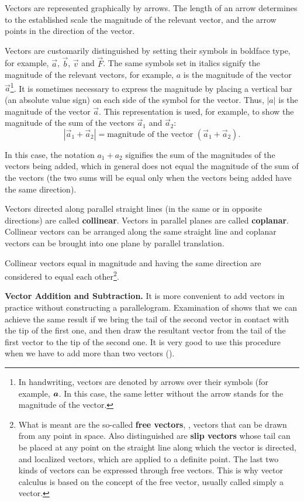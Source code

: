 Vectors are represented graphically by arrows. The length of an arrow determines to the established scale the magnitude of the relevant vector, and the arrow points in the direction of the vector.

Vectors are customarily distinguished by setting their symbols in boldface type, for example, $\vec{a}$, $\vec{b}$, $\vec{v}$ and $\vec{F}$. The same symbols set in italics signify the magnitude of the relevant vectors, for example, $a$ is the magnitude of the vector $\vec{a}$\footnote{In handwriting, vectors are denoted by arrows over their symbols (for example, $\oldvec{a}$. In this case, the same letter without the arrow stands for the magnitude of the vector.}. It is sometimes necessary to express the magnitude by placing a vertical bar (an absolute value sign) on each side of the symbol for the vector. Thus, $|a|$ is the magnitude of the vector $\vec{a}$. This representation is used, for example, to show the magnitude of the sum of the vectors $\vec{a}_1$ and $\vec{a}_2$:
\begin{equation}\label{eq:1_1}
	|\vec{a}_1 + \vec{a}_2| = \text{magnitude of the vector } (\vec{a}_1 + \vec{a}_2).
\end{equation}

\noindent
In this case, the notation $a_1+a_2$ signifies the sum of the magnitudes of the vectors being added, which in general does not equal the magnitude of the sum of the vectors (the two sums will be equal only when the vectors being added have the same direction).

Vectors directed along parallel straight lines (in the same or in opposite directions) are called \textbf{collinear}. Vectors in parallel planes are called \textbf{coplanar}. Collinear vectors can be arranged along the same straight line and coplanar vectors can be brought into one plane by parallel translation.

Collinear vectors equal in magnitude and having the same direction are considered to equal each other\footnote{What is meant are the so-called \textbf{free vectors}, \ie, vectors that can be drawn from any point in space. Also distinguished are \textbf{slip vectors} whose tail can be placed at any point on the straight line along which the vector is directed, and localized vectors, which are applied to a definite point. The last two kinds of vectors can be expressed through free vectors. This is why vector calculus is based on the concept of the free vector, usually called simply a vector.}.

\textbf{Vector Addition and Subtraction.} It is more convenient to add vectors in practice without constructing a parallelogram. Examination of  shows that we can achieve the same result if we bring the tail of the second vector in contact with the tip of the first one, and then draw the resultant vector from the tail of the first vector to the tip of the second one. It is very good to use this procedure when we have to add more than two vectors ().


